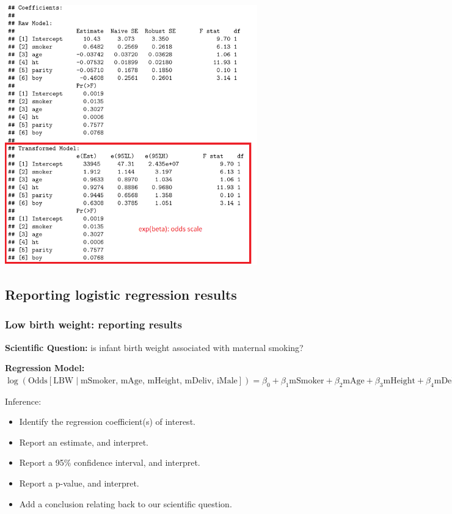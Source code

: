 \documentclass[12pt, 
hyperref={colorlinks=true, linkcolor=blue, urlcolor=cyan}]{beamer}
\begin{document}
\begin{frame}[noframenumbering]
\vspace{0.1cm}
\includegraphics[width=0.82\textwidth]{./figs/pregnancy_coef_exp}
\end{frame}

\subsection{Reporting logistic regression results}
\begin{frame}
\frametitle{Low birth weight: reporting results}
\textbf{Scientific Question:} is infant birth weight associated with maternal smoking? 

\textbf{Regression Model:}
$\log \left(\text{Odds}[ \text{LBW} \mid \text{mSmoker, mAge, mHeight, mDeliv, iMale}]\right) = \beta_0 + \beta_1 \text{mSmoker} + \beta_2 \text{mAge} + \beta_3 \text{mHeight} + \beta_4 \text{mDeliv} + \beta_5 \text{iMale}$

\color{blue} Inference: \color{black}
\begin{itemize}
\item Identify the regression coefficient(s) of interest.
\item Report an estimate, and interpret.
\item Report a 95\% confidence interval, and interpret.
\item Report a p-value, and interpret. 
\item Add a conclusion relating back to our scientific question.
\end{itemize}

\end{frame}
\end{document}

